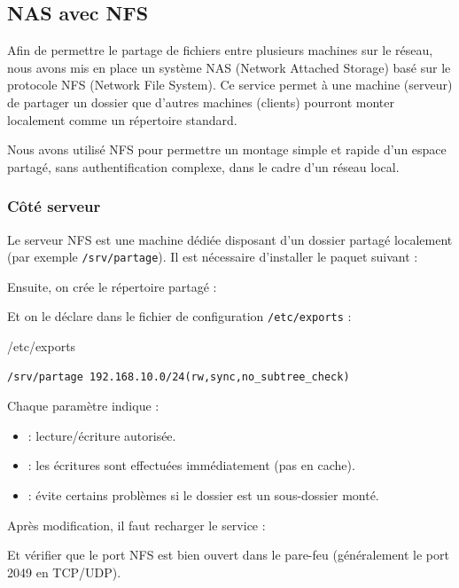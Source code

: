 \documentclass{article}
\begin{document}
\subsection{NAS avec NFS}

Afin de permettre le partage de fichiers entre plusieurs machines sur le réseau, nous avons mis en place un système NAS (Network Attached Storage) basé sur le protocole NFS (Network File System). Ce service permet à une machine (serveur) de partager un dossier que d'autres machines (clients) pourront monter localement comme un répertoire standard.

Nous avons utilisé NFS pour permettre un montage simple et rapide d’un espace partagé, sans authentification complexe, dans le cadre d’un réseau local.

\subsubsection{Côté serveur}

Le serveur NFS est une machine dédiée disposant d’un dossier partagé localement (par exemple \texttt{/srv/partage}). Il est nécessaire d’installer le paquet suivant :

Ensuite, on crée le répertoire partagé :

Et on le déclare dans le fichier de configuration \texttt{/etc/exports} :
\begin{configbox}{/etc/exports}
\begin{lstlisting}
/srv/partage 192.168.10.0/24(rw,sync,no_subtree_check)
\end{lstlisting}
\end{configbox}

Chaque paramètre indique :
\begin{itemize}
    \item {} : lecture/écriture autorisée.
    \item {} : les écritures sont effectuées immédiatement (pas en cache).
    \item {} : évite certains problèmes si le dossier est un sous-dossier monté.
\end{itemize}

Après modification, il faut recharger le service :

Et vérifier que le port NFS est bien ouvert dans le pare-feu (généralement le port 2049 en TCP/UDP).
\end{document}
